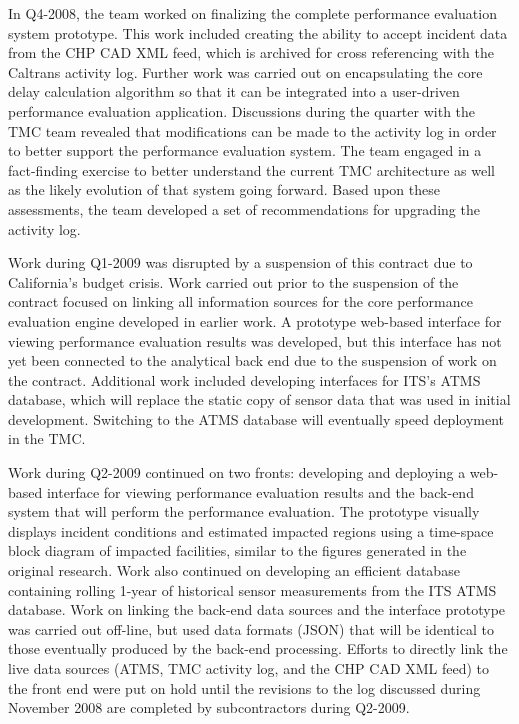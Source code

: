 In Q4-2008, the team worked on finalizing the complete performance
evaluation system prototype. This work included creating the ability
to accept incident data from the CHP CAD XML feed, which is archived
for cross referencing with the Caltrans activity log.  Further work
was carried out on encapsulating the core delay calculation algorithm
so that it can be integrated into a user-driven performance evaluation
application.  Discussions during the quarter with the TMC team
revealed that modifications can be made to the activity log in order
to better support the performance evaluation system.  The team engaged
in a fact-finding exercise to better understand the current TMC
architecture as well as the likely evolution of that system going
forward. Based upon these assessments, the team developed a set of
recommendations for upgrading the activity log.

Work during Q1-2009 was disrupted by a suspension of this contract due
to California's budget crisis.  Work carried out prior to the
suspension of the contract focused on linking all information sources
for the core performance evaluation engine developed in earlier work.
A prototype web-based interface for viewing performance evaluation
results was developed, but this interface has not yet been connected
to the analytical back end due to the suspension of work on the
contract.  Additional work included developing interfaces for ITS's
ATMS database, which will replace the static copy of sensor data that
was used in initial development. Switching to the ATMS database will
eventually speed deployment in the TMC.

Work during Q2-2009 continued on two fronts: developing and deploying
a web-based interface for viewing performance evaluation results and
the back-end system that will perform the performance evaluation. The
prototype visually displays incident conditions and estimated impacted
regions using a time-space block diagram of impacted facilities,
similar to the figures generated in the original research. Work also
continued on developing an efficient database containing rolling
1-year of historical sensor measurements from the ITS ATMS
database. Work on linking the back-end data sources and the interface
prototype was carried out off-line, but used data formats (JSON) that
will be identical to those eventually produced by the back-end
processing. Efforts to directly link the live data sources (ATMS, TMC
activity log, and the CHP CAD XML feed) to the front end were put on
hold until the revisions to the log discussed during November 2008 are
completed by subcontractors during Q2-2009.

